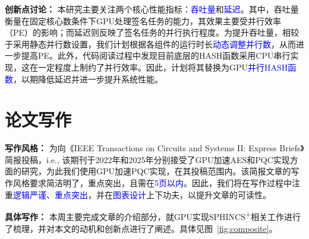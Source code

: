 \documentclass[report]{../../custom}
\begin{document}
\noindent \textbf{创新点讨论：}
本研究主要关注两个核心性能指标：\textcolor{blue}{吞吐量}和\textcolor{blue}{延迟}。其中，吞吐量衡量在固定核心数条件下GPU处理签名任务的能力，其效果主要受并行效率（PE）的影响；而延迟则反映了签名任务的并行执行程度。为提升吞吐量，相较于采用静态并行数设置，我们计划根据各组件的运行时长\textcolor{blue}{动态调整并行数}，从而进一步提高PE。此外，代码阅读过程中发现目前底层的HASH函数采用CPU串行实现，这在一定程度上制约了并行效率。因此，计划将其替换为GPU\textcolor{blue}{并行HASH函数}，以期降低延迟并进一步提升系统性能。

\section{论文写作}

\noindent \textbf{写作风格：} 为向《IEEE Transactions on Circuits and Systems II: Express Briefs》简报投稿，i.e., 该期刊于2022年和2025年分别接受了GPU加速AES和PQC实现方面的研究，为此我们使用GPU加速PQC实现，在其投稿范围内。该简报文章的写作风格要求简洁明了，重点突出，且需在\textcolor{blue}{5页以内}。因此，我们将在写作过程中注重\textcolor{blue}{逻辑严谨}、\textcolor{blue}{重点突出}，并在\textcolor{blue}{图表设计}上下功夫，以提升文章的可读性。

\noindent \textbf{具体写作：} 本周主要完成文章的介绍部分，就GPU实现SPHINCS\textsuperscript{+}相关工作进行了梳理，并对本文的动机和创新点进行了阐述。具体见图~\ref{fig:composite}。
\end{document}
